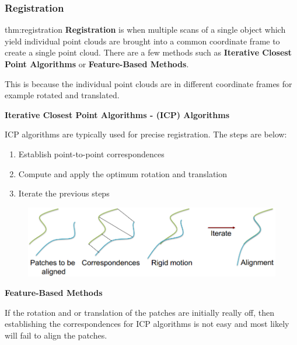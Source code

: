 \documentclass{article}
\begin{document}
\newpage

\subsubsection{Registration}

\begin{defin}[Registration]{thm:registration}
    \textbf{Registration} is when multiple scans of a single object which yield individual point clouds 
    are brought into a common coordinate frame to create a single point cloud. There are a
    few methods such as \textbf{Iterative Closest Point Algorithms} or \textbf{Feature-Based Methods}.

    \vspace{5px}

    This is because the individual point clouds are in different coordinate frames for example
    rotated and translated.
\end{defin}

\vspace{5px}

\textbf{Iterative Closest Point Algorithms - (ICP) Algorithms}

\vspace{5px}

ICP algorithms are typically used for precise registration. The steps are below:


\begin{enumerate}
    \item Establish point-to-point correspondences
    \item Compute and apply the optimum rotation and translation
    \item Iterate the previous steps
\end{enumerate}

\begin{figure}[!ht]
    \centering
    \includegraphics[width=0.8\linewidth]{images/ICPA.png}
\end{figure}

\textbf{Feature-Based Methods}

\vspace{5px}

If the rotation and or translation of the patches are initially really off, then establishing the 
correspondences for ICP algorithms is not easy and most likely will fail to align the patches.
\end{document}
